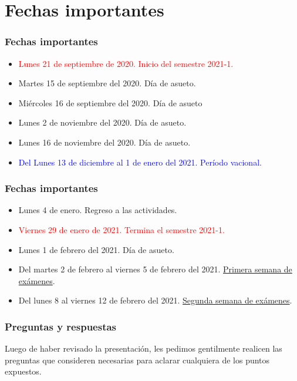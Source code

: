 \section{Fechas importantes}
\begin{frame}
\frametitle{Fechas importantes}
\fontsize{12}{12}\selectfont
\begin{itemize}
\item \textcolor{red}{Lunes 21 de septiembre de 2020. Inicio del semestre 2021-1.}
\item Martes 15 de septiembre del 2020. Día de asueto.
\item Miércoles 16 de septiembre del 2020. Día de asueto
\item Lunes 2 de noviembre del 2020. Día de asueto.
\item Lunes 16 de noviembre del 2020. Día de asueto.
\item \textcolor{blue}{Del Lunes 13 de diciembre al 1 de enero del 2021. Período vacional.}
\end{itemize}
\end{frame}
\begin{frame}
\frametitle{Fechas importantes}
\fontsize{12}{12}\selectfont
\begin{itemize}
\item Lunes 4 de enero. Regreso a las actividades.
\item \textcolor{red}{Viernes 29 de enero de 2021. Termina el semestre 2021-1.}
\item Lunes 1 de febrero del 2021. Día de asueto.
\item Del martes 2 de febrero al viernes 5 de febrero del 2021. \underline{Primera semana de exámenes}.
\item Del lunes 8 al viernes 12 de febrero del 2021. \underline{Segunda semana de exámenes}.
\end{itemize}
\end{frame}
\begin{frame}
\frametitle{Preguntas y respuestas}
Luego de haber revisado la presentación, les pedimos gentilmente realicen las preguntas que consideren necesarias para aclarar cualquiera de los puntos expuestos.
\end{frame}
